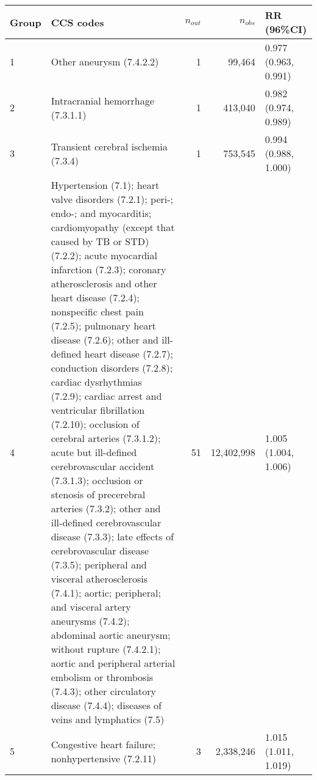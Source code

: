 \begin{tabular}{lp{6.5cm}rrp{2.2cm}}
  \hline
Group & CCS codes & $n_{out}$ & $n_{obs}$ & RR (96\%CI) \\ 
  \hline
   1 & Other aneurysm (7.4.2.2) &    1 & 99,464 & 0.977 (0.963, 0.991) \\ 
     2 & Intracranial hemorrhage (7.3.1.1) &    1 & 413,040 & 0.982 (0.974, 0.989) \\ 
     3 & Transient cerebral ischemia (7.3.4) &    1 & 753,545 & 0.994 (0.988, 1.000) \\ 
     4 & Hypertension (7.1); heart valve disorders (7.2.1); peri-; endo-; and myocarditis; cardiomyopathy (except that caused by TB or STD) (7.2.2); acute myocardial infarction (7.2.3); coronary atherosclerosis and other heart disease (7.2.4); nonspecific chest pain (7.2.5); pulmonary heart disease (7.2.6); other and ill-defined heart disease (7.2.7); conduction disorders (7.2.8); cardiac dysrhythmias (7.2.9); cardiac arrest and ventricular fibrillation (7.2.10); occlusion of cerebral arteries (7.3.1.2); acute but ill-defined cerebrovascular accident (7.3.1.3); occlusion or stenosis of precerebral arteries (7.3.2); other and ill-defined cerebrovascular disease (7.3.3); late effects of cerebrovascular disease (7.3.5); peripheral and visceral atherosclerosis (7.4.1); aortic; peripheral; and visceral artery aneurysms (7.4.2); abdominal aortic aneurysm; without rupture (7.4.2.1); aortic and peripheral arterial embolism or thrombosis (7.4.3); other circulatory disease (7.4.4); diseases of veins and lymphatics (7.5) &   51 & 12,402,998 & 1.005 (1.004, 1.006) \\ 
     5 & Congestive heart failure; nonhypertensive (7.2.11) &    3 & 2,338,246 & 1.015 (1.011, 1.019) \\ 
   \hline
\end{tabular}

